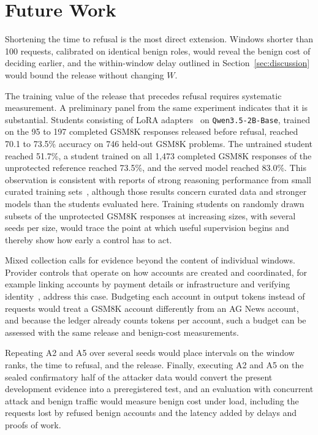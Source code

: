 \documentclass[conference]{IEEEtran}
\begin{document}
\section{Future Work}
\label{sec:future}
Shortening the time to refusal is the most direct extension. Windows shorter than 100 requests, calibrated on identical benign roles, would reveal the benign cost of deciding earlier, and the within-window delay outlined in Section~\ref{sec:discussion} would bound the release without changing $W$.

The training value of the release that precedes refusal requires systematic measurement. A preliminary panel from the same experiment indicates that it is substantial. Students consisting of LoRA adapters~\cite{hu2022lora} on \texttt{Qwen3.5-2B-Base}, trained on the 95 to 197 completed GSM8K responses released before refusal, reached 70.1 to 73.5\% accuracy on 746 held-out GSM8K problems. The untrained student reached 51.7\%, a student trained on all 1,473 completed GSM8K responses of the unprotected reference reached 73.5\%, and the served model reached 83.0\%. This observation is consistent with reports of strong reasoning performance from small curated training sets~\cite{muennighoff2025s1,ye2025limo}, although those results concern curated data and stronger models than the students evaluated here. Training students on randomly drawn subsets of the unprotected GSM8K responses at increasing sizes, with several seeds per size, would trace the point at which useful supervision begins and thereby show how early a control has to act.

Mixed collection calls for evidence beyond the content of individual windows. Provider controls that operate on how accounts are created and coordinated, for example linking accounts by payment details or infrastructure and verifying identity~\cite{anthropic2026detecting,openai2026disrupting}, address this case. Budgeting each account in output tokens instead of requests would treat a GSM8K account differently from an AG News account, and because the ledger already counts tokens per account, such a budget can be assessed with the same release and benign-cost measurements.

Repeating A2 and A5 over several seeds would place intervals on the window ranks, the time to refusal, and the release. Finally, executing A2 and A5 on the sealed confirmatory half of the attacker data would convert the present development evidence into a preregistered test, and an evaluation with concurrent attack and benign traffic would measure benign cost under load, including the requests lost by refused benign accounts and the latency added by delays and proofs of work.
\end{document}
